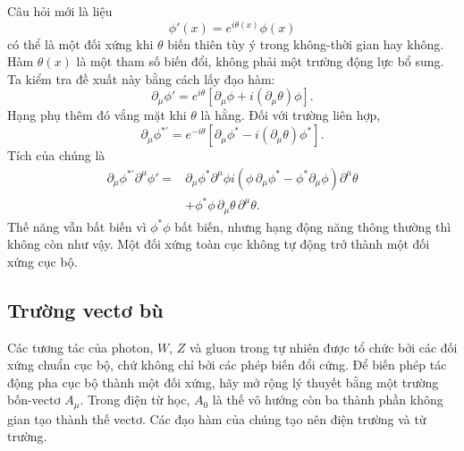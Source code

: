 Câu hỏi mới là liệu
\begin{equation}
  \phi'(x)=e^{i\theta(x)}\phi(x)
  \label{eq:l07-local-u1}
\end{equation}
có thể là một đối xứng khi \(\theta\) biến thiên tùy ý trong không-thời gian hay không. Hàm \(\theta(x)\) là một tham số biến đổi, không phải một trường động lực bổ sung. Ta kiểm tra đề xuất này bằng cách lấy đạo hàm:
\begin{equation}
  \partial_\mu\phi'
  =e^{i\theta}
   \left[\partial_\mu\phi+i(\partial_\mu\theta)\phi\right].
  \label{eq:l07-local-derivative}
\end{equation}
Hạng phụ thêm đó vắng mặt khi \(\theta\) là hằng. Đối với trường liên hợp,
\begin{equation}
  \partial_\mu\phi^{*\prime}
  =e^{-i\theta}
   \left[\partial_\mu\phi^*-i(\partial_\mu\theta)\phi^*\right].
\end{equation}
Tích của chúng là
\begin{align}
  \partial_\mu\phi^{*\prime}\partial^\mu\phi'
  ={}&
  \partial_\mu\phi^*\partial^\mu\phi
  i\left(
      \phi\,\partial_\mu\phi^*
      -\phi^*\partial_\mu\phi
    \right)\partial^\mu\theta
  \nonumber\\
  &+\phi^*\phi\,
    \partial_\mu\theta\,\partial^\mu\theta.
  \label{eq:l07-local-failure}
\end{align}
Thế năng vẫn bất biến vì \(\phi^*\phi\) bất biến, nhưng hạng động năng thông thường thì không còn như vậy. Một đối xứng toàn cục không tự động trở thành một đối xứng cục bộ.

\begin{classroomqa}
\end{classroomqa}

\subsection{Trường vectơ bù}

Các tương tác của photon, \(W\), \(Z\) và gluon trong tự nhiên được tổ chức bởi các đối xứng chuẩn cục bộ, chứ không chỉ bởi các phép biến đổi cứng. Để biến phép tác động pha cục bộ thành một đối xứng, hãy mở rộng lý thuyết bằng một trường bốn-vectơ \(A_\mu\). Trong điện từ học, \(A_0\) là thế vô hướng còn ba thành phần không gian tạo thành thế vectơ. Các đạo hàm của chúng tạo nên điện trường và từ trường.

